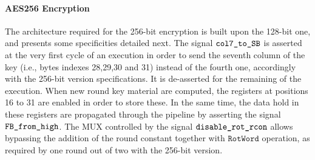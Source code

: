 \documentclass{scrartcl}
\begin{document}
\paragraph{AES256 Encryption}The architecture required for the 256-bit encryption is built upon the 128-bit
one, and presents some specificities detailed next. The signal
$\texttt{col7\_to\_SB}$ is asserted at the very first cycle of an execution in
order to send the seventh column of the key (i.e., bytes indexes 28,29,30 and
31) instead of the fourth one, accordingly with the 256-bit version
specifications. It is de-asserted for the remaining of the execution. When new
round key material are computed, the registers at positions 16 to 31 are
enabled in order to store these. In the same time, the data hold in these
registers are propagated through the pipeline by asserting the signal
$\texttt{FB\_from\_high}$. The MUX controlled by the signal $\texttt{disable\_rot\_rcon}$
allows bypassing the addition of the round constant together with
$\texttt{RotWord}$ operation, as required by one round out of two with the
256-bit version. 
\end{document}
